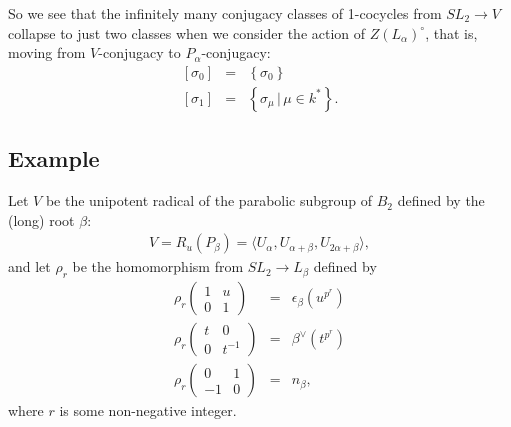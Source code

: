 So we see that the infinitely many conjugacy classes of 1-cocycles from $SL_2\rightarrow V$ collapse to just two classes when we consider the action of $Z(L_\alpha)^\circ$, that is, moving from $V$-conjugacy to $P_\alpha$-conjugacy:
\begin{eqnarray*}
\left[ \sigma_0 \right] &=& \left\{ \sigma_0 \right\} \\
\left[ \sigma_1 \right] &=& \left\{ \sigma_\mu \, |\, \mu \in k^* \right\}.
\end{eqnarray*}

\subsection{Example}
Let $V$ be the unipotent radical of the parabolic subgroup of $B_2$ defined by the (long) root $\beta$:
\begin{eqnarray*}
V=R_u(P_\beta)=\langle U_\alpha, U_{\alpha + \beta}, U_{2\alpha + \beta} \rangle,
\end{eqnarray*}
and let $\rho_r$ be the homomorphism from $SL_2 \rightarrow L_\beta$ defined by
\begin{eqnarray*}
\rho_r\left(\begin{matrix} 1 & u \\ 0 & 1\end{matrix}\right) &=& \epsilon_\beta(u^{p^r}) \\
\rho_r\left(\begin{matrix} t & 0 \\ 0 & t^{-1}\end{matrix}\right) &=& \beta^\vee(t^{p^r}) \\
\rho_r\left(\begin{matrix} 0 & 1 \\ -1 & 0\end{matrix}\right) &=& n_\beta,
\end{eqnarray*}
where $r$ is some non-negative integer.

